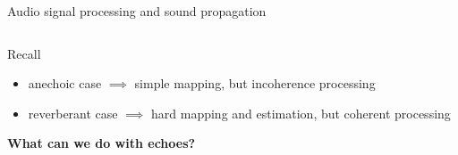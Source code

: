 \begin{frame}{Audio signal processing and sound propagation}
\begin{columns}[T,onlytextwidth]
    \end{columns}


    \begin{block}{Recall}
        \begin{itemize}
            \item anechoic case $\implies$ simple mapping, but incoherence processing
            \item reverberant case $\implies$ hard mapping and estimation, but coherent processing
        \end{itemize}
        \hfill \textcolor{myred}{\textbf{What can we do with echoes?}}
    \end{block}
\end{frame}

